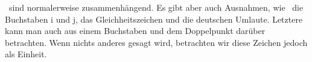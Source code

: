 \begin{description}
	\item[]     

	\item[] 
	\item[] 
	\item[] 
	\item[] 

	\item[]      
	\item[]      
	\item[]      
	\item[]      

	\item[]    
	\item[]   

	\item[]          
	\item[]          
	\item[]          

	\item[]     
	\item[]     
\end{description}

\TypographischeZeichen\ sind normalerweise zusammenhängend.
Es gibt aber auch Ausnahmen, wie \textzB\ die Buchstaben i und j, das Gleichheitszeichen und die deutschen Umlaute.
Letztere kann man auch  aus einem Buchstaben und dem Doppelpunkt darüber betrachten.
Wenn nichts anderes gesagt wird, betrachten wir diese Zeichen jedoch als Einheit.

